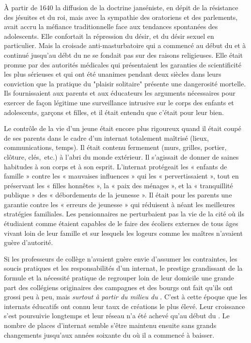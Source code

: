   À partir de 1640 la diffusion de la doctrine janséniste, en dépit de la résistance des jésuites et du roi, mais avec la sympathie des oratoriens et des parlements, avait accru la méfiance traditionnelle face aux tendances spontanées des adolescents. Elle confortait la répression du désir, et du désir sexuel en particulier. Mais la croisade anti-masturbatoire qui a commencé au début du  et à continué jusqu'au débt du  ne se fondait pas sur des raisons religieuses. Elle était promue par des autorités médicales qui présentaient les garanties de scientificité les plus sérieuses et qui ont été unanimes pendant deux siècles dans leurs conviction que la pratique du "plaisir solitaire" présente une dangerosité mortelle. Ils fournissaient aux parents et aux éducateurs les arguments nécessaires pour exercer de façon légitime une surveillance intrusive sur le corps des enfants et adolescents, garçons et filles, et  il était entendu que c'était pour leur bien. 
  
  Le contrôle de la vie d'un jeune était encore plus rigoureux quand il était coupé de ses parents dans le cadre d'un internat totalement maîtrisé (lieux, communications, temps). Il était contenu fermement (murs, grilles, portier, clôture, clés,~etc.) à l'abri du monde extérieur. Il s'agissait de donner de saines habitudes à son corps et à son esprit.  L'internat protégeait les « enfants de famille » contre les « mauvaises influences » qui les « pervertissaient », tout en préservant les « filles honnêtes », la « paix des ménages », et la « tranquillité publique » des « débordements de la jeunesse ». Il était pour les parents une garantie contre les « erreurs de jeunesse » qui réduisent à néant les meilleures stratégies familiales. Les pensionnaires ne perturbaient pas la vie de la cité où ils étudiaient comme étaient capables de le faire des écoliers externes de tous âges vivant loin de leur famille et sur lesquels les logeurs comme les maîtres n'avaient guère d'autorité. 
  
  Si les professeurs de collège n'avaient guère envie d'assumer les contraintes, les soucis pratiques et les responsabilités d'un internat, le prestige grandissant de la formule et la nécessité pratique de regrouper loin de leur domicile une grande part des collégiens originaires des campagnes et des bourgs  ont fait qu'ils ont grossi peu à peu, mais \emph{surtout à partir du milieu du }. C'est à cette époque que les internats éducatifs ont connu leur taux de créations le plus élevé. Leur croissance s'est poursuivie longtemps et leur réseau n'a été achevé qu'au début du . Le nombre de places d'internat semble s'être maintenu ensuite sans grands changements jusqu'aux années soixante du  où il a commencé à baisser.
 
 
 
  




